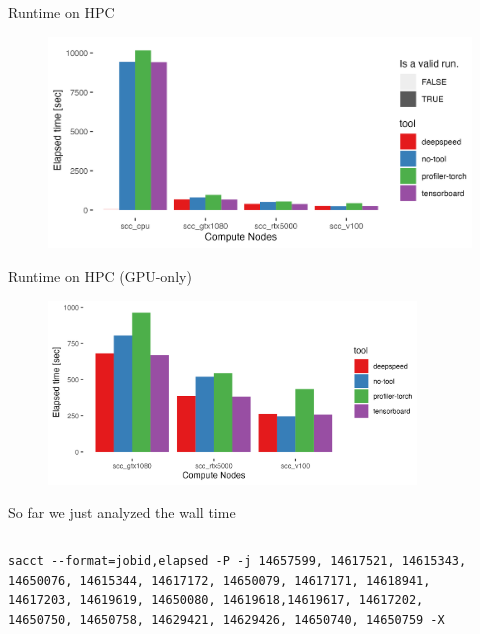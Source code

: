 \documentclass[compress,aspectratio=169]{beamer}
\begin{document}
\begin{frame}{Runtime on HPC}
    \begin{center}
    \begin{figure}
        \includegraphics[width=1\textwidth]{./assets/sacct_barplot_by_nodes_no-experiment}
    \end{figure}
    \end{center}
\end{frame}

\begin{frame}{Runtime on HPC (GPU-only)}
    \begin{center}
    \begin{figure}
        \includegraphics[width=0.87\textwidth]{./assets/sacct_barplot_by_nodes_no-experiment_gpu}
    \end{figure}
    \end{center}
\end{frame}

\begin{frame}[fragile]{So far we just analyzed the wall time}
\begin{columns}
\begin{column}{0.7\textwidth}
        \begin{verbatim}
sacct --format=jobid,elapsed -P -j 14657599, 14617521, 14615343, 14650076, 14615344, 14617172, 14650079, 14617171, 14618941, 14617203, 14619619, 14650080, 14619618,14619617, 14617202, 14650750, 14650758, 14629421, 14629426, 14650740, 14650759 -X
        \end{verbatim}
\end{column}

\begin{column}{0.3\textwidth}
    \vspace{-2em}
        \inputminted[xleftmargin=1em,linenos,fontsize=\tiny,]{python}{./assets/sacct.out}
\end{column}
\end{columns}
\end{frame}
\end{document}
